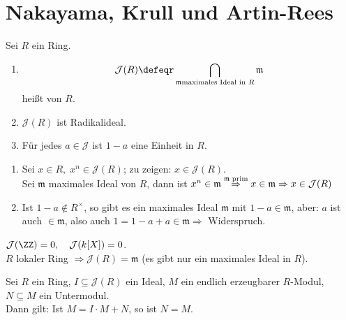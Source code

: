 \section{Nakayama, Krull und Artin-Rees}

\begin{DefBem}

Sei $R$ ein Ring.
\begin{enumerate}
	\item $$\mathcal{J}(R) \defeqr \bigcap_{\mathfrak{m}\text{\scriptsize maximales Ideal in }R}\mathfrak{m}$$ heißt  von $R$.
	\item $\mathcal{J}(R)$ ist Radikalideal.
	\item Für jedes $a \in \mathcal{J}$ ist $1-a$ eine Einheit in $R$.
\end{enumerate}

\end{DefBem}

\begin{Bew}

\begin{enumerate}
	\item Sei $x \in R, \; x^n \in \mathcal{J}(R)$; zu zeigen: $x \in \mathcal{J}(R)$.\\
	Sei $\mathfrak{m}$ maximales Ideal von $R$, dann ist $x^n \in \mathfrak{m} \overset{\mathfrak{m} \; \text{\scriptsize prim}}{\Rightarrow} x \in \mathfrak{m} \Rightarrow x \in \mathcal{J}(R)$
	\item Ist $1-a \notin R^{\times}$, so gibt es ein maximales Ideal
	$\mathfrak{m}$ mit $1-a \in \mathfrak{m}$, aber: $a$ ist auch $\in
	\mathfrak{m}$, also auch $1 = 1-a+a \in \mathfrak{m} \Rightarrow$ Widerspruch.
\end{enumerate}
\end{Bew}

\begin{nnBsp}
  $\mathcal{J}(\ZZ) = 0, \quad \mathcal{J}(k[X]) = 0$.\\
  $R$ lokaler Ring $\Rightarrow \mathcal{J}(R) = \mathfrak{m}$ (es gibt nur ein
  maximales Ideal in $R$).
\end{nnBsp}

\begin{Satz}
\label{Satz8}
  Sei $R$ ein Ring, $I \subseteq \mathcal{J}(R)$ ein Ideal, $M$ ein endlich erzeugbarer $R$-Modul, $N \subseteq M$ ein Untermodul.\\
  Dann gilt: Ist $M = I \cdot M + N$, so ist $N = M$.
\end{Satz}

